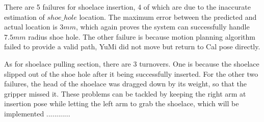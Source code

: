There are 5 failures for shoelace insertion, 4 of which are due to the inaccurate estimation of $shoe\_hole$ location. The maximum error between the predicted and actual location is $3mm$, which again proves the system can successfully handle $7.5mm$ radius shoe hole. The other failure is because motion planning algorithm failed to provide a valid path, YuMi did not move but return to Cal pose directly. 

As for shoelace pulling section, there are 3 turnovers. One is because the shoelace slipped out of the shoe hole after it being successfully inserted. For the other two failures, the head of the shoelace was dragged down by its weight, so that the gripper missed it. These problems can be tackled by keeping the right arm at insertion pose while letting the left arm to grab the shoelace, which will be implemented ............

